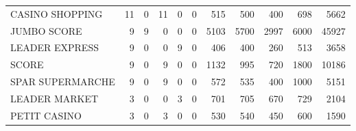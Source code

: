 \documentclass[11pt]{article}
\begin{document}
\begin{table}[H]
\begin{tabular}{lrrrrrrrrrr}
CASINO SHOPPING  &         11 &          0 &         11 &          0 &          0 &        515 &        500 &        400 &        698 &       5662 \\
JUMBO SCORE      &          9 &          9 &          0 &          0 &          0 &       5103 &       5700 &       2997 &       6000 &      45927 \\
LEADER EXPRESS   &          9 &          0 &          0 &          9 &          0 &        406 &        400 &        260 &        513 &       3658 \\
SCORE            &          9 &          0 &          9 &          0 &          0 &       1132 &        995 &        720 &       1800 &      10186 \\
SPAR SUPERMARCHE &          9 &          0 &          9 &          0 &          0 &        572 &        535 &        400 &       1000 &       5151 \\
LEADER MARKET    &          3 &          0 &          0 &          3 &          0 &        701 &        705 &        670 &        729 &       2104 \\
PETIT CASINO     &          3 &          0 &          3 &          0 &          0 &        530 &        540 &        450 &        600 &       1590 \\
\bottomrule
\end{tabular}
\end{table}
\end{document}
